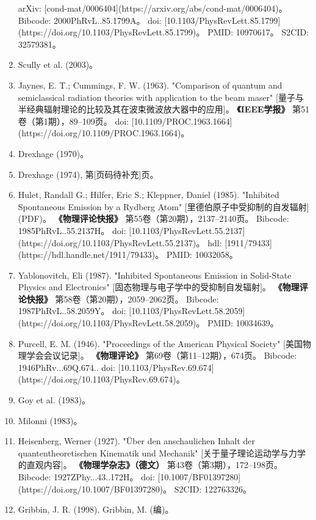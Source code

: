 \begin{enumerate}
  arXiv: [cond-mat/0006404](https://arxiv.org/abs/cond-mat/0006404)。  
  Bibcode: 2000PhRvL..85.1799A。  
  doi: [10.1103/PhysRevLett.85.1799](https://doi.org/10.1103/PhysRevLett.85.1799)。  
  PMID: 10970617。  
  S2CID: 32579381。  
\item Scully et al. (2003)。  
\item Jaynes, E. T.; Cummings, F. W. (1963).  
  "Comparison of quantum and semiclassical radiation theories with application to the beam maser" [量子与半经典辐射理论的比较及其在波束微波放大器中的应用]。  
  \textbf{《IEEE学报》} 第51卷（第1期），89–109页。  
  doi: [10.1109/PROC.1963.1664](https://doi.org/10.1109/PROC.1963.1664)。  
\item Drexhage (1970)。  
\item Drexhage (1974), 第[页码待补充]页。 
\item Hulet, Randall G.; Hilfer, Eric S.; Kleppner, Daniel (1985).  
  "Inhibited Spontaneous Emission by a Rydberg Atom" [里德伯原子中受抑制的自发辐射] (PDF)。  
  \textbf{《物理评论快报》} 第55卷（第20期），2137–2140页。  
  Bibcode: 1985PhRvL..55.2137H。  
  doi: [10.1103/PhysRevLett.55.2137](https://doi.org/10.1103/PhysRevLett.55.2137)。  
  hdl: [1911/79433](https://hdl.handle.net/1911/79433)。  
  PMID: 10032058。  
\item Yablonovitch, Eli (1987). 
  "Inhibited Spontaneous Emission in Solid-State Physics and Electronics" [固态物理与电子学中的受抑制自发辐射]。  
  \textbf{《物理评论快报》} 第58卷（第20期），2059–2062页。  
  Bibcode: 1987PhRvL..58.2059Y。  
  doi: [10.1103/PhysRevLett.58.2059](https://doi.org/10.1103/PhysRevLett.58.2059)。  
  PMID: 10034639。  
\item Purcell, E. M. (1946).  
  "Proceedings of the American Physical Society" [美国物理学会会议记录]。  
  \textbf{《物理评论》} 第69卷（第11–12期），674页。  
  Bibcode: 1946PhRv...69Q.674..  
  doi: [10.1103/PhysRev.69.674](https://doi.org/10.1103/PhysRev.69.674)。  
\item Goy et al. (1983)。  
\item Milonni (1983)。  
\item Heisenberg, Werner (1927). 
  "Über den anschaulichen Inhalt der quantentheoretischen Kinematik und Mechanik" [关于量子理论运动学与力学的直观内容]。  
  \textbf{《物理学杂志》（德文）} 第43卷（第3期），172–198页。  
  Bibcode: 1927ZPhy...43..172H。  
  doi: [10.1007/BF01397280](https://doi.org/10.1007/BF01397280)。  
  S2CID: 122763326。  
\item Gribbin, J. R. (1998).  
  Gribbin, M. (编)。  

\end{enumerate}
